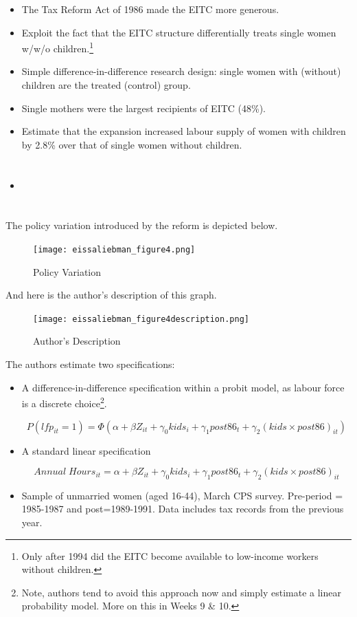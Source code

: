 \documentclass[
  letterpaper,
  DIV=11,
  numbers=noendperiod]{scrreprt}
\theoremstyle{definition}
\theoremstyle{remark}
\begin{document}
\begin{itemize}
\item
  The Tax Reform Act of 1986 made the EITC more generous.
\item
  Exploit the fact that the EITC structure differentially treats single
  women w/w/o children.\footnote{Only after 1994 did the EITC become
    available to low-income workers without children.}
\item
  Simple difference-in-difference research design: single women with
  (without) children are the treated (control) group.
\item
  Single mothers were the largest recipients of EITC (48\%).
\item
  Estimate that the expansion increased labour supply of women with
  children by 2.8\% over that of single women without children.
\item
  \hypertarget{section-1}{%
  \section{}\label{section-1}}
\end{itemize}

The policy variation introduced by the reform is depicted below.

\begin{figure}

{\centering \texttt{[image: eissaliebman\_figure4.png]}

}

\caption{Policy Variation}

\end{figure}

And here is the author's description of this graph.

\begin{figure}

{\centering \texttt{[image: eissaliebman\_figure4description.png]}

}

\caption{Author's Description}

\end{figure}

The authors estimate two specifications:

\begin{itemize}
\item
  A difference-in-difference specification within a probit model, as
  labour force is a discrete choice\footnote{Note, authors tend to avoid
    this approach now and simply estimate a linear probability model.
    More on this in Weeks 9 \& 10.}.

  \[P(lfp_{it}=1) = \Phi\left(\alpha + \beta Z_{it}+\gamma_0kids_i + \gamma_1post86_t+\gamma_2(kids\times post86)_{it}\right)\]
\item
  A standard linear specification

  \[Annual\;Hours_{it} = \alpha + \beta Z_{it}+\gamma_0kids_i + \gamma_1post86_t+\gamma_2(kids\times post86)_{it}\]
\item
  Sample of unmarried women (aged 16-44), March CPS survey. Pre-period =
  1985-1987 and post=1989-1991. Data includes tax records from the
  previous year.
\end{itemize}
\end{document}
